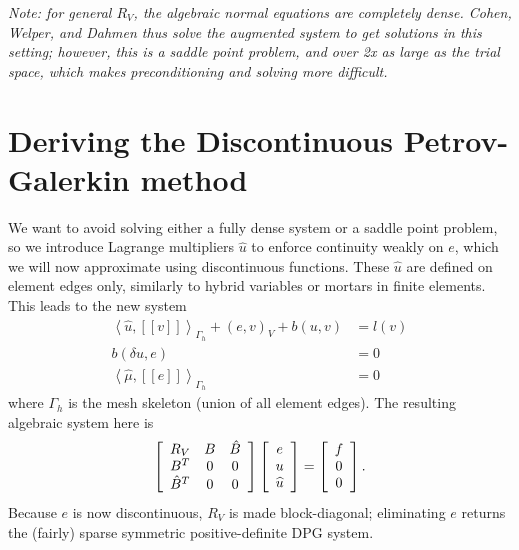 \documentclass{article}
\newcommand{\LRs}[1]{\left[ #1 \right]}
\newcommand{\LRa}[1]{\left\langle #1 \right\rangle}
\newcommand{\jump}[1] {\ensuremath{\LRs{\![#1]\!}}}
\newcommand{\uh}{\widehat{u}}
\newcommand{\Gh}{\Gamma_h}
\begin{document}
\emph{Note: for general $R_V$, the algebraic normal equations are completely dense.  Cohen, Welper, and Dahmen thus solve the augmented system to get solutions in this setting; however, this is a saddle point problem, and over 2x as large as the trial space, which makes preconditioning and solving more difficult. }

\section{Deriving the Discontinuous Petrov-Galerkin method}
We want to avoid solving either a fully dense system or a saddle point problem, so we introduce Lagrange multipliers $\uh$ to enforce continuity weakly on $e$, which we will now approximate using discontinuous functions.  These $\uh$ are defined on element edges only, similarly to hybrid variables or mortars in finite elements.  This leads to the new system 
\begin{align*}
\LRa{\uh, \jump{v}}_{\Gh} + (e,v)_V + b(u,v) &= l(v) \\
b(\delta u,e) &= 0\\
\LRa{\hat{\mu}, \jump{e}}_{\Gh} &= 0
\end{align*}
where $\Gh$ is the mesh skeleton (union of all element edges).  The resulting algebraic system here is 
\[
\left[
\begin{array}{c c c}
R_V & B& \hat{B}\\
B^T & 0& 0\\
\hat{B}^T & 0& 0
\end{array}
\right]
\left[\begin{array}{c}
e \\ u\\ \uh
\end{array}
\right]
= 
\left[\begin{array}{c}
f\\0\\0
\end{array}
\right].
\]
Because $e$ is now discontinuous, $R_V$ is made block-diagonal; eliminating $e$ returns the (fairly) sparse symmetric positive-definite DPG system.
\end{document}
